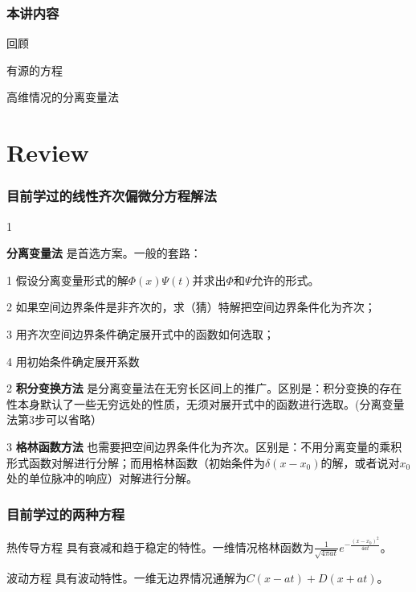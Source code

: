 \documentclass[CJK]{beamer}
\date{}
\begin{document}
  \bch
{}

\begin{frame}
\frametitle{本讲内容}

\bitem
\item{回顾}
\item{有源的方程}    
\item{高维情况的分离变量法}
\eitem

\end{frame}


\section{Review}

\begin{frame}
\frametitle{目前学过的线性齐次偏微分方程解法}

\bitem
\item[1]{{\blue \bf 分离变量法} 是首选方案。一般的套路：
  \bitem
      \item[1]{ 假设分离变量形式的解$\Phi(x)\Psi(t)$并求出$\Phi$和$\Psi$允许的形式。}
      \item[2]{如果空间边界条件是非齐次的，求（猜）特解把空间边界条件化为齐次； }
      \item[3]{用齐次空间边界条件确定展开式中的函数如何选取；}
      \item[4]{用初始条件确定展开系数}
        \eitem}
\item[2]{{\blue \bf 积分变换方法} 是分离变量法在无穷长区间上的推广。区别是：积分变换的存在性本身默认了一些无穷远处的性质，无须对展开式中的函数进行选取。(分离变量法第3步可以省略）}
\item[3]{{\blue \bf 格林函数方法} 也需要把空间边界条件化为齐次。区别是：不用分离变量的乘积形式函数对解进行分解；而用格林函数（初始条件为$\delta(x-x_0)$的解，或者说对$x_0$处的单位脉冲的响应）对解进行分解。}
\eitem

\end{frame}


\begin{frame}
\frametitle{目前学过的两种方程}

热传导方程
具有衰减和趋于稳定的特性。一维情况格林函数为$\frac{1}{\sqrt{4\pi at}}e^{-\frac{(x-x_0)^2}{4at}}$。

\skiplines

波动方程
具有波动特性。一维无边界情况通解为$C(x-at)+D(x+at)$。

\end{frame}
\end{document}
